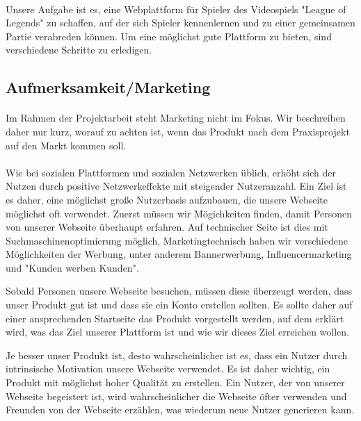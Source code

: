 \paragraph{}
Unsere Aufgabe ist es, eine Webplattform für Spieler des Videospiels "League of Legends" zu schaffen, auf der sich Spieler kennenlernen und zu einer gemeinsamen Partie verabreden können. Um eine möglichst gute Plattform zu bieten, sind verschiedene Schritte zu erledigen.

\subsection{Aufmerksamkeit/Marketing}
\paragraph{}
Im Rahmen der Projektarbeit steht Marketing nicht im Fokus. Wir beschreiben daher nur kurz, worauf zu achten ist, wenn das Produkt nach dem Praxisprojekt auf den Markt kommen soll.

\paragraph{}
Wie bei sozialen Plattformen und sozialen Netzwerken üblich, erhöht sich der Nutzen durch positive Netzwerkeffekte mit steigender Nutzeranzahl. Ein Ziel ist es daher, eine möglichst große Nutzerbasis aufzubauen, die unsere Webseite möglichst oft verwendet.
Zuerst müssen wir Mögichkeiten finden, damit Personen von unserer Webseite überhaupt erfahren. Auf technischer Seite ist dies mit Suchmaschinenoptimierung möglich, Marketingtechnisch haben wir verschiedene Möglichkeiten der Werbung, unter anderem Bannerwerbung, Influencermarketing und "Kunden werben Kunden".

Sobald Personen unsere Webseite besuchen, müssen diese überzeugt werden, dass unser Produkt gut ist und dass sie ein Konto erstellen sollten. Es sollte daher auf einer ansprechenden Startseite das Produkt vorgestellt werden, auf dem erklärt wird, was das Ziel unserer Plattform ist und wie wir dieses Ziel erreichen wollen.

Je besser unser Produkt ist, desto wahrscheinlicher ist es, dass ein Nutzer durch intrinsische Motivation unsere Webseite verwendet. Es ist daher wichtig, ein Produkt mit möglichst hoher Qualität zu erstellen. Ein Nutzer, der von unserer Webseite begeistert ist, wird wahrscheinlicher die Webseite öfter verwenden und Freunden von der Webseite erzählen, was wiederum neue Nutzer generieren kann.

